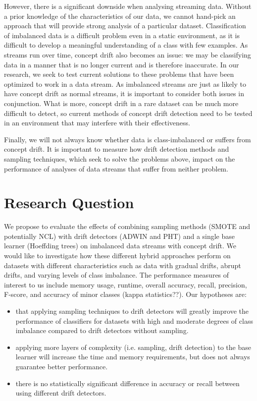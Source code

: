 \documentclass[11pt]{article}\usepackage[]{graphicx}\usepackage[]{color}
\begin{document}
However, there is a significant downside when analysing streaming data. Without a prior knowledge of the characteristics of our data, we cannot hand-pick an approach that will provide strong analysis of a particular dataset. Classification of imbalanced data is a difficult problem even in a static environment, as it is difficult to develop a meaningful understanding of a class with few examples. As streams run over time, concept drift also becomes an issue: we may be classifying data in a manner that is no longer current and is therefore inaccurate. In our research, we seek to test current solutions to these problems that have been optimized to work in a data stream. As imbalanced streams are just as likely to have concept drift as normal streams, it is important to consider both issues in conjunction. What is more, concept drift in a rare dataset can be much more difficult to detect, so current methods of concept drift detection need to be tested in an environment that may interfere with their effectiveness.

Finally, we will not always know whether data is class-imbalanced or suffers from concept drift. It is important to measure how drift detection methods and sampling techniques, which seek to solve the problems above, impact on the performance of analyses of data streams that suffer from neither problem.

\section{Research Question}

We propose to evaluate the effects of combining sampling methods (SMOTE and potentially NCL) with drift detectors (ADWIN and PHT) and a single base learner (Hoeffding trees) on imbalanced data streams with concept drift. We would like to investigate how these different hybrid approaches perform on datasets with different characteristics such as data with gradual drifts, abrupt drifts, and varying levels of class imbalance. The performance measures of interest to us include memory usage, runtime, overall accuracy, recall, precision, F-score, and accuracy of minor classes (kappa statistics??). Our hypotheses are:

\begin{itemize}
\item that applying sampling techniques to drift detectors will greatly improve the performance of classifiers for datasets with high and moderate degrees of class imbalance compared to drift detectors without sampling. 
\item applying more layers of complexity (i.e. sampling, drift detection) to the base learner will increase the time and memory requirements, but does not always guarantee better performance.
\item there is no statistically significant difference in accuracy or recall between using different drift detectors.
\end{itemize} 
\end{document}

